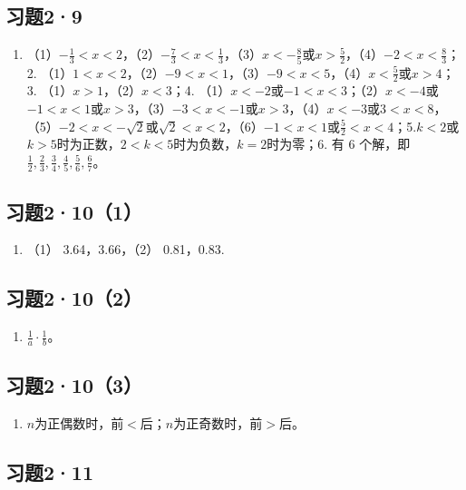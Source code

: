 \subsection{习题2·9}

\begin{enumerate}
\item
  （1）\(-\frac{1}{3} < x < 2\)，（2）\(-\frac{7}{3} < x < \frac{1}{3}\)，（3）\(x < -\frac{8}{5}\)或\(x > \frac{5}{2}\)，（4）\(-2 < x < \frac{8}{3}\)；2.
  （1）\(1 < x < 2\)，（2）\(-9 < x < 1\)，（3）\(-9 < x < 5\)，（4）\(x < \frac{5}{2}\)或\(x > 4\)；3.
  （1）\(x > 1\)，（2）\(x < 3\)；4.
  （1）\(x < -2\)或\(-1 < x < 3\)；（2）\(x < -4\)或\(-1 < x < 1\)或\(x > 3\)，（3）\(-3 < x < -1\)或\(x > 3\)，（4）\(x < -3\)或\(3 < x < 8\)，（5）\(-2 < x < -\sqrt{2}\)或\(\sqrt{2} < x < 2\)，（6）\(-1 < x < 1\)或\(\frac{5}{2} < x < 4\)；5.\(k < 2\)或\(k > 5\)时为正数，\(2 < k < 5\)时为负数，\(k = 2\)时为零；6.
  有 6
  个解，即\(\frac{1}{2}, \frac{2}{3}, \frac{3}{4}, \frac{4}{5}, \frac{5}{6}, \frac{6}{7}\)。
\end{enumerate}

\subsection{习题2·10（1）}

\begin{enumerate}
\item
  （1） 3.64，3.66，（2） 0.81，0.83.
\end{enumerate}

\subsection{习题2·10（2）}

\begin{enumerate}[start=4]
\item
  \(\frac{1}{a} \cdot \frac{1}{b}\)。
\end{enumerate}

\subsection{习题2·10（3）}

\begin{enumerate}[start=1]
\item
  \(n\)为正偶数时，前\(<\)后；\(n\)为正奇数时，前\(>\)后。
\end{enumerate}

\subsection{习题2·11}

